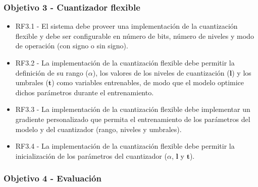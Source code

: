 \subsubsection*{Objetivo 3 - Cuantizador flexible}

\begin{itemize}
    \item RF3.1 - El sistema debe proveer una implementación de la cuantización flexible y debe ser configurable en número de bits, número de niveles y modo de operación (con signo o sin signo).

    \item RF3.2 - La implementación de la cuantización flexible debe permitir la definición de su rango ($\alpha$), los valores de los niveles de cuantización ($\mathbf{l}$) y los umbrales ($\mathbf{t}$) como variables entrenables, de modo que el modelo optimice dichos parámetros durante el entrenamiento.

    \item RF3.3 - La implementación de la cuantización flexible debe implementar un gradiente personalizado que permita el entrenamiento de los parámetros del modelo y del cuantizador (rango, niveles y umbrales).

    \item RF3.4 - La implementación de la cuantización flexible debe permitir la inicialización de los parámetros del cuantizador ($\alpha$, $\mathbf{l}$ y $\mathbf{t}$).
\end{itemize}

\subsubsection*{Objetivo 4 - Evaluación}

